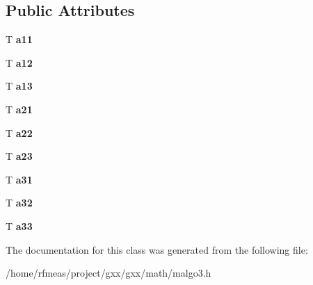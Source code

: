 \subsection*{Public Attributes}
\begin{DoxyCompactItemize}
\item 
T {\bfseries a11}\hypertarget{classmalgo_1_1matrix3_a0ab017b257fa0db5752c86087f7deaa8}{}\label{classmalgo_1_1matrix3_a0ab017b257fa0db5752c86087f7deaa8}

\item 
T {\bfseries a12}\hypertarget{classmalgo_1_1matrix3_acf258d0056f9469ab710502b2b13c085}{}\label{classmalgo_1_1matrix3_acf258d0056f9469ab710502b2b13c085}

\item 
T {\bfseries a13}\hypertarget{classmalgo_1_1matrix3_aeb4f2c8d7967047d3e3514d9280305a6}{}\label{classmalgo_1_1matrix3_aeb4f2c8d7967047d3e3514d9280305a6}

\item 
T {\bfseries a21}\hypertarget{classmalgo_1_1matrix3_a11db0c0bfc774bcb36269880d686c3af}{}\label{classmalgo_1_1matrix3_a11db0c0bfc774bcb36269880d686c3af}

\item 
T {\bfseries a22}\hypertarget{classmalgo_1_1matrix3_a1ddde7da874d85f5dca8be98a1ed9212}{}\label{classmalgo_1_1matrix3_a1ddde7da874d85f5dca8be98a1ed9212}

\item 
T {\bfseries a23}\hypertarget{classmalgo_1_1matrix3_a53c6fea0b7ff7d87265c78d7016c2aa9}{}\label{classmalgo_1_1matrix3_a53c6fea0b7ff7d87265c78d7016c2aa9}

\item 
T {\bfseries a31}\hypertarget{classmalgo_1_1matrix3_a91c9cbdd7b97aca8971fb7da70dcbcfa}{}\label{classmalgo_1_1matrix3_a91c9cbdd7b97aca8971fb7da70dcbcfa}

\item 
T {\bfseries a32}\hypertarget{classmalgo_1_1matrix3_a473e41cb3ca7bd8bd53dc499b12a2d23}{}\label{classmalgo_1_1matrix3_a473e41cb3ca7bd8bd53dc499b12a2d23}

\item 
T {\bfseries a33}\hypertarget{classmalgo_1_1matrix3_aa0a2cd8a1d3bb348fb7982fe588ae614}{}\label{classmalgo_1_1matrix3_aa0a2cd8a1d3bb348fb7982fe588ae614}

\end{DoxyCompactItemize}


The documentation for this class was generated from the following file\+:\begin{DoxyCompactItemize}
\item 
/home/rfmeas/project/gxx/gxx/math/malgo3.\+h\end{DoxyCompactItemize}
